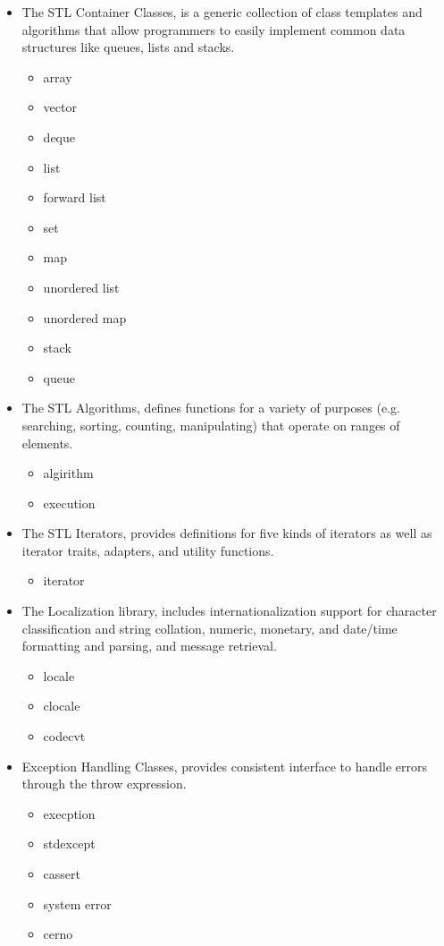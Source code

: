 \documentclass[12pt]{article}
\begin{document}
{\begin{enumerate}
\begin{itemize}
	\item The STL Container Classes,  is a generic collection of class templates and algorithms that allow programmers to easily implement common data structures like queues, lists and stacks.\cite{cppreferenceLib}
		\begin{itemize}
		\item array
		\item vector
		\item deque
		\item list
		\item forward list
		\item set
		\item map
		\item unordered list
		\item unordered map
		\item  stack
		\item  queue
		\end{itemize}
		
	\item The STL Algorithms, defines functions for a variety of purposes (e.g. searching, sorting, counting, manipulating) that operate on ranges of elements.\cite{cppreferenceLib}
		\begin{itemize}
		\item algirithm
		\item execution
		\end{itemize}

	\item The STL Iterators, provides definitions for five kinds of iterators as well as iterator traits, adapters, and utility functions.\cite{cppreferenceLib}
		\begin{itemize}
		\item iterator
		\end{itemize}
		
	\item The Localization library, includes internationalization support for character classification and string collation, numeric, monetary, and date/time formatting and parsing, and message retrieval.\cite{cppreferenceLib}
		\begin{itemize}
		\item locale
		\item clocale
		\item codecvt
		\end{itemize}
		
	\item Exception Handling Classes, provides consistent interface to handle errors through the throw expression.\cite{cppreferenceLib}
		\begin{itemize}
		\item execption
		\item stdexcept
		\item cassert
		\item system error
		\item cerno
		\end{itemize}
		

\end{itemize}
\end{enumerate}}
\end{document}
